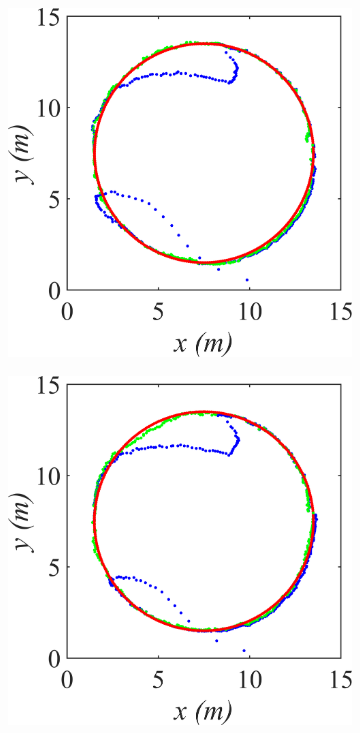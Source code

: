 \begin{figure}
\begin{subfigure}[tb]{0.2\textwidth}
        \caption{}
    \end{subfigure}
        \begin{subfigure}[tb]{0.2\textwidth}
        \includegraphics[width=\textwidth]{img/KL_2.png}
        \caption{}
    \end{subfigure}
        \begin{subfigure}[tb]{0.2\textwidth}
        \includegraphics[width=\textwidth]{img/KL_3.png}

\end{subfigure}
\end{figure}
